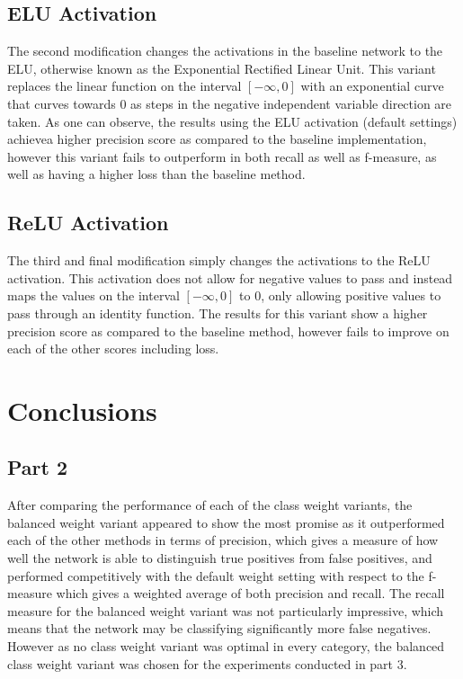 \documentclass{article}
\begin{document}
\subsection*{ELU Activation}
The second modification changes the activations in the baseline network to the ELU, otherwise known as the Exponential Rectified Linear Unit. This variant replaces the linear function on the interval $[-\infty,0]$ with an exponential curve that curves towards 0 as steps in the negative independent variable direction are taken. As one can observe, the results using the ELU activation (default settings) achievea higher precision score as compared to the baseline implementation, however this variant fails to outperform in both recall as well as f-measure, as well as having a higher loss than the baseline method.
		

\subsection*{ReLU Activation}
The third and final modification simply changes the activations to the ReLU activation. This activation does not allow for negative values to pass and instead maps the values on the interval $[-\infty,0]$ to 0, only allowing positive values to pass through an identity function. The results for this variant show a higher precision score as compared to the baseline method, however fails to improve on each of the other scores including loss. 
		


\section{Conclusions}
\subsection{Part 2}
After comparing the performance of each of the class weight variants, the balanced weight variant appeared to show the most promise as it outperformed each of the other methods in terms of precision, which gives a measure of how well the network is able to distinguish true positives from false positives, and performed competitively with the default weight setting with respect to the f-measure which gives a weighted average of both precision and recall. The recall measure for the balanced weight variant was not particularly impressive, which means that the network may be classifying significantly more false negatives. However as no class weight variant was optimal in every category, the balanced class weight variant was chosen for the experiments conducted in part 3.
\end{document}
